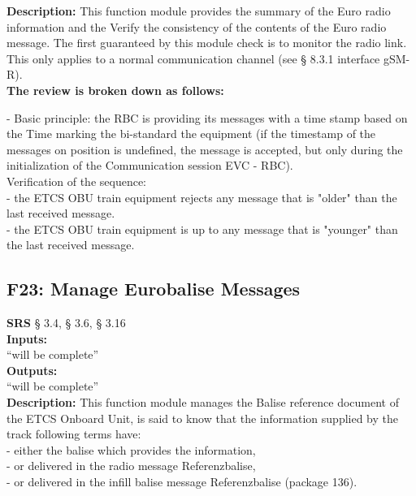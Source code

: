 \documentclass{template/openetcs_report}
\begin{document}
\textbf{Description:} 
This function module provides the summary of the Euro radio information and the 
Verify the consistency of the contents of the Euro radio message. 
The first guaranteed by this module check is to monitor the radio link. 
This only applies to a normal communication channel (see § 8.3.1 interface gSM-R). \\

\textbf{The review is broken down as follows:}

- Basic principle: the RBC is providing its messages with a time stamp based on the 
Time marking the bi-standard the equipment (if the timestamp of the messages on 
position is undefined, the message is accepted, but only during the initialization of the 
Communication session EVC - RBC).\\

Verification of the sequence: \\

- the ETCS OBU train equipment rejects any message that is "older" than the last 
received message.\\

- the ETCS OBU train equipment is up to any message that is "younger" than the last 
received message.\\
 	 
 	 
\subsection{F23: Manage Eurobalise Messages}
\textbf{SRS} § 3.4, § 3.6, § 3.16\\
  
   \textbf{Inputs:}\\
``will be complete''\\

 \textbf{Outputs:}\\
 ``will be complete''\\
 
\textbf{Description:} 
This function module manages the Balise reference document of the ETCS Onboard Unit, 
is said to know that the information supplied by the track following terms have: \\

- either the balise which provides the information, \\

- or delivered in the radio message Referenzbalise, \\

- or delivered in the infill balise message Referenzbalise (package 136). \\
\end{document}
